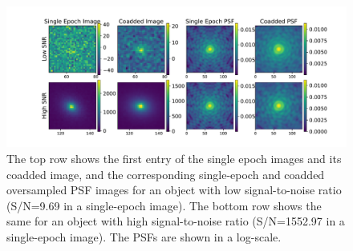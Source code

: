 \documentclass[fleqn,usenatbib]{mnras}
\begin{document}
\begin{figure}
	\includegraphics[width=\textwidth]{figure2.pdf}
	\vspace*{-10mm}
    \caption{The top row shows the first entry of the single epoch images and its coadded image, and the corresponding single-epoch and coadded oversampled PSF images for an object with low signal-to-noise ratio (S/N=9.69 in a single-epoch image). The bottom row shows the same for an object with high signal-to-noise ratio (S/N=1552.97 in a single-epoch image). The PSFs are shown in a log-scale.}
    \label{fig:singlecoadd}
\end{figure}
\end{document}
